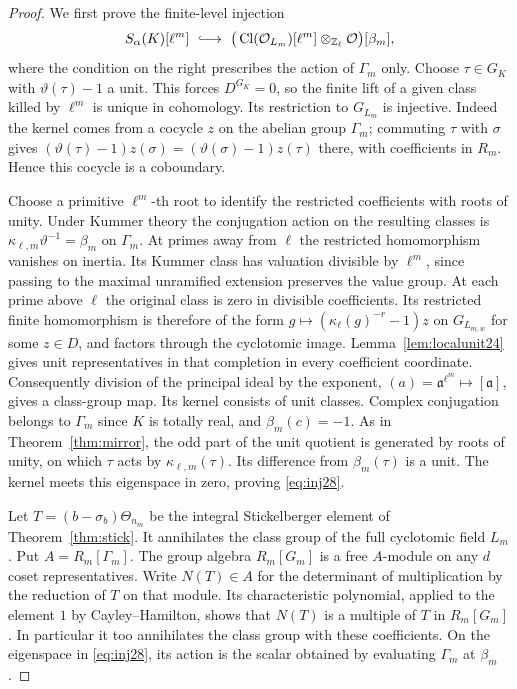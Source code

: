 \documentclass[a4paper,11pt]{article}
\theoremstyle{definition}
\theoremstyle{remark}
\newcommand{\ZZ}{\mathbb Z}\newcommand{\ord}{\operatorname{ord}}
\numberwithin{equation}{section}
\newcommand{\Cl}{\operatorname{Cl}}
\newcommand{\OO}{\mathcal O}
\begin{document}
\begin{proof}
We first prove the finite-level injection
\begin{equation}
 S_\alpha(K)[\ell^m]\ \lhook\joinrel\longrightarrow\
 \big(\Cl(\OO_{L_m})[\ell^m]\otimes_{\ZZ_\ell}\OO\big)[\beta_m],
                                                        \label{eq:inj28}
\end{equation}
where the condition on the right prescribes the action of \(\Gamma_m\) only. Choose \(\tau\in G_K\) with \(\vartheta(\tau)-1\) a unit. This forces \(D^{G_K}=0\), so the finite lift of a given class killed by \(\ell^m\) is unique in cohomology. Its restriction to \(G_{L_m}\) is injective. Indeed the kernel comes from a cocycle \(z\) on the abelian group \(\Gamma_m\); commuting \(\tau\) with \(\sigma\) gives \((\vartheta(\tau)-1)z(\sigma)=(\vartheta(\sigma)-1)z(\tau)\) there, with coefficients in \(R_m\). Hence this cocycle is a coboundary.

Choose a primitive \(\ell^m\)-th root to identify the restricted coefficients with roots of unity. Under Kummer theory the conjugation action on the resulting classes is \(\kappa_{\ell,m}\vartheta^{-1}=\beta_m\) on \(\Gamma_m\). At primes away from \(\ell\) the restricted homomorphism vanishes on inertia. Its Kummer class has valuation divisible by \(\ell^m\), since passing to the maximal unramified extension preserves the value group. At each prime above \(\ell\) the original class is zero in divisible coefficients. Its restricted finite homomorphism is therefore of the form \(g\mapsto(\kappa_\ell(g)^{-r}-1)z\) on \(G_{L_{m,w}}\) for some \(z\in D\), and factors through the cyclotomic image. Lemma~\ref{lem:localunit24} gives unit representatives in that completion in every coefficient coordinate. Consequently division of the principal ideal by the exponent, \((a)=\mathfrak a^{\ell^m}\mapsto [\mathfrak a]\), gives a class-group map. Its kernel consists of unit classes. Complex conjugation belongs to \(\Gamma_m\) since \(K\) is totally real, and \(\beta_m(c)=-1\). As in Theorem~\ref{thm:mirror}, the odd part of the unit quotient is generated by roots of unity, on which \(\tau\) acts by \(\kappa_{\ell,m}(\tau)\). Its difference from \(\beta_m(\tau)\) is a unit. The kernel meets this eigenspace in zero, proving \eqref{eq:inj28}.

Let \(T=(b-\sigma_b)\Theta_{n_m}\) be the integral Stickelberger element of Theorem~\ref{thm:stick}. It annihilates the class group of the full cyclotomic field \(L_m\). Put \(A=R_m[\Gamma_m]\). The group algebra \(R_m[G_m]\) is a free \(A\)-module on any \(d\) coset representatives. Write \(N(T)\in A\) for the determinant of multiplication by the reduction of \(T\) on that module. Its characteristic polynomial, applied to the element \(1\) by Cayley--Hamilton, shows that \(N(T)\) is a multiple of \(T\) in \(R_m[G_m]\). In particular it too annihilates the class group with these coefficients. On the eigenspace in \eqref{eq:inj28}, its action is the scalar obtained by evaluating \(\Gamma_m\) at \(\beta_m\).


\end{proof}
\end{document}
